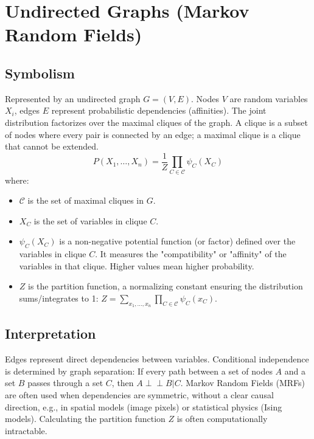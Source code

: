 \documentclass{article}
\newcommand{\Indep}{\perp \!\!\! \perp} %
\begin{document}
\section{Undirected Graphs (Markov Random Fields)}

\subsection*{Symbolism}
Represented by an undirected graph $G = (V, E)$. Nodes $V$ are random variables $X_i$, edges $E$ represent probabilistic dependencies (affinities). The joint distribution factorizes over the maximal cliques of the graph. A clique is a subset of nodes where every pair is connected by an edge; a maximal clique is a clique that cannot be extended.
\[ P(X_1, \dots, X_n) = \frac{1}{Z} \prod_{C \in \mathcal{C}} \psi_C(X_C) \]
where:
\begin{itemize}
    \item $\mathcal{C}$ is the set of maximal cliques in $G$.
    \item $X_C$ is the set of variables in clique $C$.
    \item $\psi_C(X_C)$ is a non-negative potential function (or factor) defined over the variables in clique $C$. It measures the "compatibility" or "affinity" of the variables in that clique. Higher values mean higher probability.
    \item $Z$ is the partition function, a normalizing constant ensuring the distribution sums/integrates to 1: $Z = \sum_{x_1, \dots, x_n} \prod_{C \in \mathcal{C}} \psi_C(x_C)$.
\end{itemize}

\subsection*{Interpretation}
Edges represent direct dependencies between variables. Conditional independence is determined by graph separation: If every path between a set of nodes $A$ and a set $B$ passes through a set $C$, then $A \Indep B | C$. Markov Random Fields (MRFs) are often used when dependencies are symmetric, without a clear causal direction, e.g., in spatial models (image pixels) or statistical physics (Ising models). Calculating the partition function $Z$ is often computationally intractable.
\end{document}
